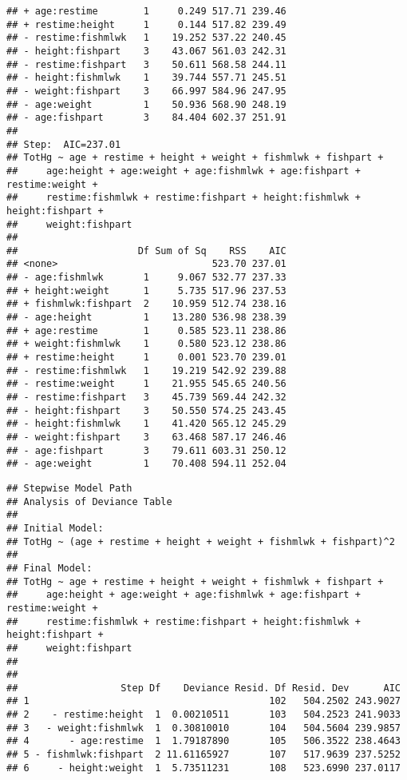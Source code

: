 \documentclass[12pt,]{article}
\newenvironment{Shaded}{\begin{snugshade}}{\end{snugshade}}
\newcommand{\CommentTok}[1]{\textcolor[rgb]{0.56,0.35,0.01}{\textit{#1}}}
\newcommand{\OperatorTok}[1]{\textcolor[rgb]{0.81,0.36,0.00}{\textbf{#1}}}
\newcommand{\NormalTok}[1]{#1}
\begin{document}
\begin{verbatim}
## + age:restime        1     0.249 517.71 239.46
## + restime:height     1     0.144 517.82 239.49
## - restime:fishmlwk   1    19.252 537.22 240.45
## - height:fishpart    3    43.067 561.03 242.31
## - restime:fishpart   3    50.611 568.58 244.11
## - height:fishmlwk    1    39.744 557.71 245.51
## - weight:fishpart    3    66.997 584.96 247.95
## - age:weight         1    50.936 568.90 248.19
## - age:fishpart       3    84.404 602.37 251.91
## 
## Step:  AIC=237.01
## TotHg ~ age + restime + height + weight + fishmlwk + fishpart + 
##     age:height + age:weight + age:fishmlwk + age:fishpart + restime:weight + 
##     restime:fishmlwk + restime:fishpart + height:fishmlwk + height:fishpart + 
##     weight:fishpart
## 
##                     Df Sum of Sq    RSS    AIC
## <none>                           523.70 237.01
## - age:fishmlwk       1     9.067 532.77 237.33
## + height:weight      1     5.735 517.96 237.53
## + fishmlwk:fishpart  2    10.959 512.74 238.16
## - age:height         1    13.280 536.98 238.39
## + age:restime        1     0.585 523.11 238.86
## + weight:fishmlwk    1     0.580 523.12 238.86
## + restime:height     1     0.001 523.70 239.01
## - restime:fishmlwk   1    19.219 542.92 239.88
## - restime:weight     1    21.955 545.65 240.56
## - restime:fishpart   3    45.739 569.44 242.32
## - height:fishpart    3    50.550 574.25 243.45
## - height:fishmlwk    1    41.420 565.12 245.29
## - weight:fishpart    3    63.468 587.17 246.46
## - age:fishpart       3    79.611 603.31 250.12
## - age:weight         1    70.408 594.11 252.04
\end{verbatim}

\begin{Shaded}
\end{Shaded}

\begin{verbatim}
## Stepwise Model Path 
## Analysis of Deviance Table
## 
## Initial Model:
## TotHg ~ (age + restime + height + weight + fishmlwk + fishpart)^2
## 
## Final Model:
## TotHg ~ age + restime + height + weight + fishmlwk + fishpart + 
##     age:height + age:weight + age:fishmlwk + age:fishpart + restime:weight + 
##     restime:fishmlwk + restime:fishpart + height:fishmlwk + height:fishpart + 
##     weight:fishpart
## 
## 
##                  Step Df    Deviance Resid. Df Resid. Dev      AIC
## 1                                          102   504.2502 243.9027
## 2    - restime:height  1  0.00210511       103   504.2523 241.9033
## 3   - weight:fishmlwk  1  0.30810010       104   504.5604 239.9857
## 4       - age:restime  1  1.79187890       105   506.3522 238.4643
## 5 - fishmlwk:fishpart  2 11.61165927       107   517.9639 237.5252
## 6     - height:weight  1  5.73511231       108   523.6990 237.0117
\end{verbatim}
\end{document}
